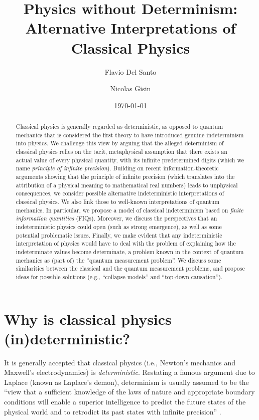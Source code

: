 \documentclass[aps,prl,twocolumn,showpacs,superscriptaddress,groupedaddress, nofootinbib]{revtex4-1}
\begin{document}
\title{Physics without Determinism: Alternative Interpretations of Classical Physics}
\author{Flavio Del Santo}
\author{Nicolas Gisin}

\date{\today}

\begin{abstract}
Classical physics is generally regarded as deterministic, as opposed to quantum mechanics that is considered the first theory to have introduced genuine indeterminism into physics. We challenge this view by arguing that the alleged determinism of classical physics relies on the tacit, metaphysical assumption that there exists an actual value of every physical quantity, with its infinite predetermined digits (which we name \emph{principle of infinite precision}). Building on recent information-theoretic arguments showing that the principle of infinite precision (which translates into the attribution of a physical meaning to mathematical real numbers) leads to unphysical consequences, we consider possible alternative indeterministic interpretations of classical physics. We also link those to well-known interpretations of quantum mechanics. In particular, we propose a model of classical indeterminism based on \emph{finite information quantities} (FIQs). Moreover, we discuss the perspectives that an indeterministic physics could open (such as strong emergence), as well as some potential problematic issues. Finally, we make evident that any indeterministic interpretation of physics would have to deal with the problem of explaining how the indeterminate values become determinate, a problem known in the context of quantum mechanics as (part of) the ``quantum measurement problem''. We discuss some similarities between the classical and the quantum measurement problems, and propose ideas for possible solutions (e.g., ``collapse models'' and ``top-down causation'').


\end{abstract}

\maketitle
\section{Why is classical physics (in)deterministic?}
It is generally accepted that classical physics (i.e., Newton's mechanics and Maxwell's electrodynamics) is \emph{deterministic}. Restating a famous argument due to Laplace (known as Laplace's demon), determinism is usually assumed to be the ``view that a sufficient knowledge of the laws of nature and appropriate boundary conditions will enable a superior intelligence to predict the future states of the physical world and to retrodict its past states with infinite precision'' \cite{determinism}.
\end{document}
